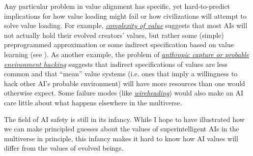 \documentclass[]{article}
\begin{document}
Any particular problem in value alignment has specific, yet
hard-to-predict implications for how value loading might fail or how
civilizations will attempt to solve value loading. For example,
\href{https://wiki.lesswrong.com/wiki/Complexity_of_value}{\emph{complexity
of value}} suggests that most AIs will not actually hold their evolved
creators' values, but rather some (simple) preprogrammed approximation
or some indirect specification based on value learning (see
\cite{Bostrom2014-ay}). As another example, the problem of
\href{https://arbital.com/p/probable_environment_hacking/}{\emph{anthropic capture or probable
environment hacking}} suggests that indirect specifications of values are less common and that
``mean'' value systems (i.e. ones that imply a willingness to hack other AI's probable environment)
will have more resources than one would otherwise expect.  Some failure modes (like
\href{https://casparoesterheld.com/2016/07/08/wireheading/}{\emph{wireheading}}) would also make an
AI care little about what happens elsewhere in the multiverse.

The field of AI safety is still in its infancy. While I hope to have
illustrated how we can make principled guesses about the values of
superintelligent AIs in the multiverse in principle, this infancy makes
it hard to know how AI values will differ from the values of evolved
beings.

\begin{sloppypar} %
\printbibliography
\end{sloppypar}
\end{document}

